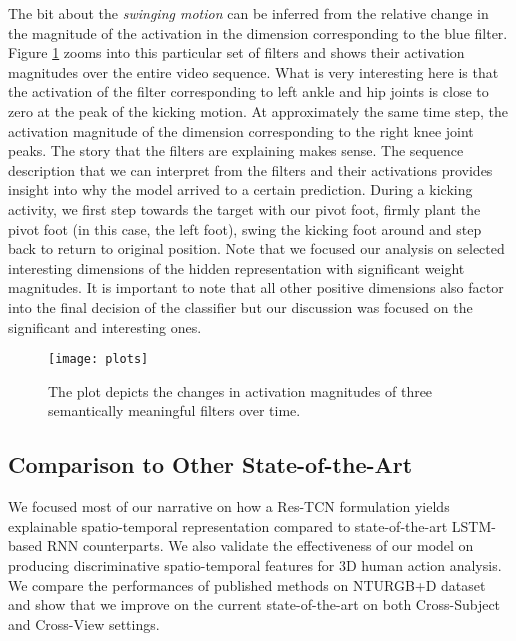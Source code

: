\documentclass[10pt,twocolumn,letterpaper]{article}
\begin{document}
The bit about the \textit{swinging motion} can be inferred from the relative change in the magnitude of the activation in the dimension corresponding to the blue filter. Figure \ref{fig:plots} zooms into this particular set of filters and shows their activation magnitudes over the entire video sequence. What is very interesting here is that the activation of the filter corresponding to left ankle and hip joints is close to zero at the peak of the kicking motion. At approximately the same time step, the activation magnitude of the dimension corresponding to the right knee joint peaks. The story that the filters are explaining makes sense. The sequence description that we can interpret from the filters and their activations provides insight into why the model arrived to a certain prediction. During a kicking activity, we first step towards the target with our pivot foot, firmly plant the pivot foot (in this case, the left foot), swing the kicking foot around and step back to return to original position. Note that we focused our analysis on selected interesting dimensions of the hidden representation with significant weight magnitudes. It is important to note that all other positive dimensions also factor into the final decision of the classifier but our discussion was focused on the significant and interesting ones.


\begin{figure}[t]
\begin{center}
 \texttt{[image: plots]}
\end{center}
 \caption{The plot depicts the changes in activation magnitudes of three semantically meaningful filters over time.}
\label{fig:plots}
\end{figure}

\subsection{Comparison to Other State-of-the-Art}
We focused most of our narrative on how a Res-TCN formulation yields explainable spatio-temporal representation compared to state-of-the-art LSTM-based RNN counterparts. We also validate the effectiveness of our model on producing discriminative spatio-temporal features for 3D human action analysis. We compare the performances of published methods on NTURGB+D dataset and show that we improve on the current state-of-the-art on both Cross-Subject and Cross-View settings.
\end{document}
